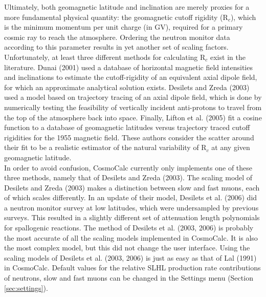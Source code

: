 \documentclass{article}
\begin{document}
Ultimately,  both  geomagnetic  latitude  and inclination  are  merely
proxies  for a  more  fundamental physical  quantity: the  geomagnetic
cutoff rigidity (R$_c$), which is the minimum momentum per unit charge
(in GV),  required for a primary  cosmic ray to reach  the atmosphere. 
Ordering the neutron monitor  data according to this parameter results
in yet another set of  scaling factors.  Unfortunately, at least three
different  methods for  calculating  R$_c$ exist  in  the literature.  
Dunai (2001) used a  database of horizontal magnetic field intensities
and  inclinations to  estimate  the cutoff-rigidity  of an  equivalent
axial  dipole  field, for  which  an  approximate analytical  solution
exists.  Desilets  and Zreda (2003)  used a model based  on trajectory
tracing of an axial dipole field, which is done by numerically testing
the feasibility of vertically incident anti-protons to travel from the
top of the atmosphere back into space.  Finally, Lifton et al.  (2005)
fit a  cosine function to  a database of geomagnetic  latitudes versus
trajectory  traced cutoff  rigidities  for the  1955  magnetic field.  
These authors consider the scatter  around their fit to be a realistic
estimator of the natural variability of R$_c$ at any given geomagnetic
latitude.
\\

In order  to avoid confusion, CosmoCalc currently  only implements one
of these three methods, namely that of Desilets and Zreda (2003).  The
scaling model of Desilets and Zreda (2003) makes a distinction between
slow and fast muons, each of which scales differently. In an update of
their model, Desilets  et al.  (2006) did a  neutron monitor survey at
low  latitudes, which  were  undersampled by  previous surveys.   This
resulted in a slightly different set of attenuation length polynomials
for  spallogenic reactions.   The method  of Desilets  et  al.  (2003,
2006) is  probably  the  most  accurate  of  all  the  scaling  models
implemented in CosmoCalc.  It is also the most complex model, but this
did  not change  the  user  interface.  Using  the  scaling models  of
Desilets et al.  (2003, 2006) is just as easy as that of Lal (1991) in
CosmoCalc.   Default  values for  the  relative  SLHL production  rate
contributions of neutrons,  slow and fast muons can  be changed in the
Settings menu  (Section \ref{sec:settings}).  
\\
\end{document}
